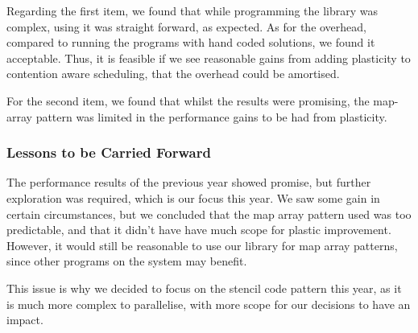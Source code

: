 Regarding the first item, we found that while programming the library was complex, using it was straight forward, as expected. As for the overhead, compared to running the programs with hand coded solutions, we found it acceptable. Thus, it is feasible if we see reasonable gains from adding plasticity to contention aware scheduling, that the overhead could be amortised.

For the second item, we found that whilst the results were promising, the map-array pattern was limited in the performance gains to be had from plasticity.



\subsubsection{Lessons to be Carried Forward}
\label{section:background:lessons_to_be_carried_forward}

The performance results of the previous year showed promise, but further exploration was required, which is our focus this year. We saw some gain in certain circumstances, but we concluded that the map array pattern used was too predictable, and that it didn't have have much scope for plastic improvement. However, it would still be reasonable to use our library for map array patterns, since other programs on the system may benefit.

This issue is why we decided to focus on the stencil code pattern this year, as it is much more complex to parallelise, with more scope for our decisions to have an impact.